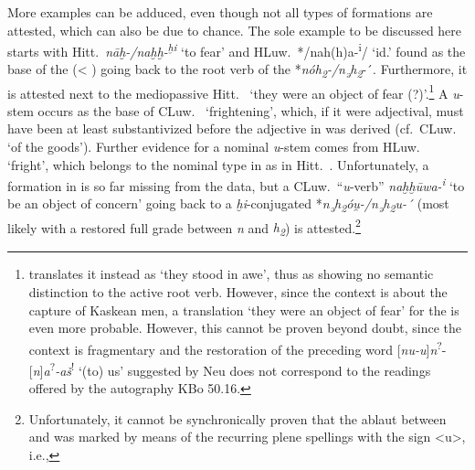 \documentclass[output=paper,colorlinks,citecolor=brown]{langscibook}
\begin{document}
More examples can be adduced, even though not all types of formations are attested, which can also be due to chance. The sole example to be discussed here starts with Hitt.\ \textit{nāḫ-/naḫḫ-\textsuperscript{ḫi}} ‘to fear’ and HLuw.\ */nah(h)a-\textsuperscript{i}/ ‘id.’ found as the base of the   (< ) going back to the root verb of the  *\textit{nóh\textsubscript{2}-/n\textsubscript{ə}h\textsubscript{2}}-´. Furthermore, it is attested next to the mediopassive Hitt.\  ‘they were an object of fear (?)’.\footnote{\citet[120]{Neu1968} translates it instead as ‘they stood in awe’, thus as showing no semantic distinction to the active root verb. However, since the context is about the capture of Kaskean men, a translation ‘they were an object of fear’ for the  is even more probable. However, this cannot be proven beyond doubt, since the context is fragmentary and the restoration of the preceding word [\textit{nu-u}]\textit{n}\textsuperscript{?}-[\textit{n}]\textit{a}\textsuperscript{?}\textit{-aš}\textsuperscript{!} ‘(to) us’ suggested by Neu does not correspond to the readings offered by the autography KBo 50.16.} A \textit{u}-stem occurs as the base of CLuw.\  ‘frightening’, which, if it were adjectival, must have been at least substantivized before the  adjective in  was derived (cf.\ CLuw.\  ‘of the goods’). Further evidence for a nominal \textit{u}-stem comes from HLuw.\  ‘fright’, which belongs to the nominal type in  as in Hitt.\ . Unfortunately, a formation in  is so far missing from the data, but a CLuw.\ “\textit{u}-verb” \textit{naḫḫūwa-\textsuperscript{i}} ‘to be an object of concern’ going back to a \textit{ḫi}-conjugated *\textit{n\textsubscript{ə}h\textsubscript{2}óu̯-/n\textsubscript{ə}h\textsubscript{2}u-´} (most likely with a restored full grade between \textit{n} and \textit{h\textsubscript{2}}) is attested.\footnote{Unfortunately, it cannot be synchronically proven that the ablaut between  and  was marked by means of the recurring plene spellings with the sign <u>, i.e.,   
}
\end{document}
